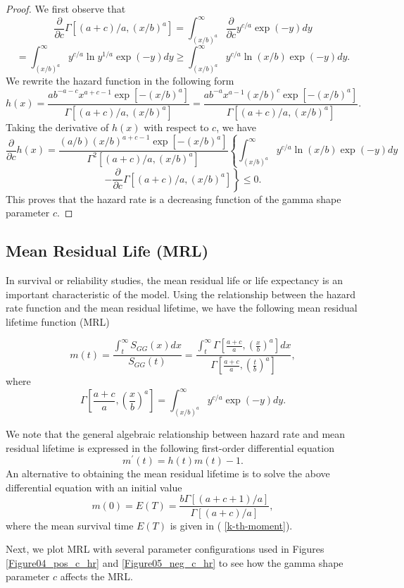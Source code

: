 \documentclass{ps}
\theoremstyle{plain}%
\theoremstyle{definition}
\theoremstyle{remark}
\begin{document}
\begin{proof}
	We first observe that 
	$$
	\frac{\partial}{\partial c}\Gamma\left[(a+c)/a, (x/b)^a \right] = \int_{(x/b)^a}^\infty \frac{\partial}{\partial c}y^{c/a}\exp(-y)dy 
	$$	
	$$
	=\int_{(x/b)^a}^\infty  y^{c/a}\ln y^{1/a}\exp(-y)dy \ge \int_{(x/b)^a}^\infty  y^{c/a}\ln (x/b)\exp(-y)dy.
	$$
	We rewrite the hazard function in the following form
	$$
	h(x) = \frac{ab^{-a-c}x^{a+c-1}\exp[-(x/b)^a]}{\Gamma[(a+c)/a, (x/b)^a]}
	= \frac{ab^{-a}x^{a-1}(x/b)^c\exp[-(x/b)^a]}{\Gamma[(a+c)/a, (x/b)^a]}.
	$$
	Taking the derivative of $h(x)$ with respect to $c$, we have
	$$
	\frac{\partial}{\partial c}h(x) = \frac{(a/b)(x/b)^{a+c-1}\exp[-(x/b)^a]}{\Gamma^2[(a+c)/a, (x/b)^a]} \left\{  \int_{(x/b)^a}^\infty  y^{c/a}\ln (x/b)\exp(-y)dy \right. $$ 
	$$ \left.- \frac{\partial}{\partial c}\Gamma\left[(a+c)/a, (x/b)^a \right] \right\}  \le 0.
	$$
	This proves that the hazard rate is a decreasing function of the gamma shape parameter $c$.  
\end{proof}


\subsection{Mean Residual Life (MRL)} \label{MRL}

In survival or reliability studies, the mean residual life or life expectancy is an important characteristic of the model. Using the relationship between the hazard rate function and the mean residual lifetime, we have the following mean residual lifetime function (MRL)

$$
m(t) = \frac{\int_t^\infty S_{GG}(x)dx}{S_{GG}(t)} = \frac{\int_t^\infty \Gamma[\frac{a+c}{a}, (\frac{x}{b})^a ]dx}{\Gamma[ \frac{a+c}{a}, (\frac{t}{b})^a ]},
$$
\noindent where
$$
\Gamma\left[\frac{a+c}{a}, \left(\frac{x}{b}\right)^a\right]=\int_{(x/b)^a}^\infty y^{c/a}\exp(-y) dy.
$$

We note that the general algebraic relationship between hazard rate and mean residual lifetime is expressed in the following first-order differential equation 
$$
m^\prime (t) = h(t) m(t) - 1.
$$ 
An alternative to obtaining the mean residual lifetime is to solve the above differential equation with an initial value
$$
m(0) = E(T) = \frac{b\Gamma[(a+c+1)/a]}{\Gamma[(a+c)/a]},
$$
where the mean survival time $E(T)$ is given in ( \ref{k-th-moment}).

Next, we plot MRL with several parameter configurations used in Figures \ref{Figure04_pos_c_hr} and \ref{Figure05_neg_c_hr} to see how the gamma shape parameter $c$ affects the MRL.
\end{document}
